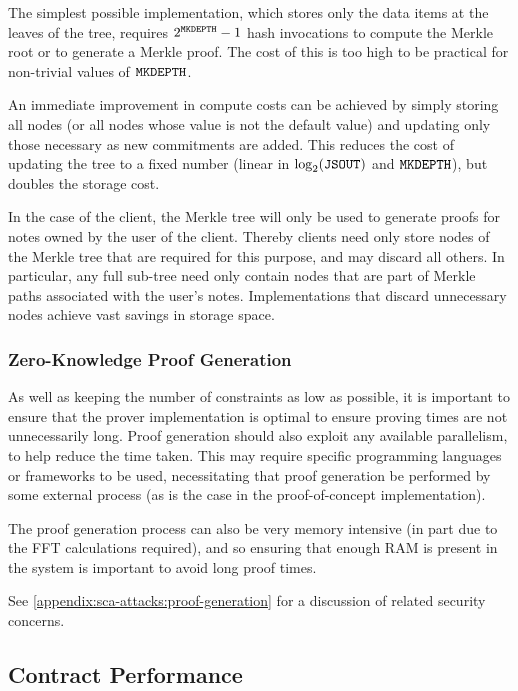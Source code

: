 The simplest possible implementation, which stores only the data items at the leaves of the tree, requires $2^{\mathtt{MKDEPTH}} - 1$ hash invocations to compute the Merkle root or to generate a Merkle proof. The cost of this is too high to be practical for non-trivial values of $\mathtt{MKDEPTH}$.

An immediate improvement in compute costs can be achieved by simply storing all nodes (or all nodes whose value is not the default value) and updating only those necessary as new commitments are added. This reduces the cost of updating the tree to a fixed number (linear in $\log_2(\mathtt{JSOUT})$ and $\mathtt{MKDEPTH}$), but doubles the storage cost.

In the case of the client, the Merkle tree will only be used to generate proofs for notes owned by the user of the client. Thereby clients need only store nodes of the Merkle tree that are required for this purpose, and may discard all others. In particular, any full sub-tree need only contain nodes that are part of Merkle paths associated with the user's notes. Implementations that discard unnecessary nodes achieve vast savings in storage space.

\subsubsection{Zero-Knowledge Proof Generation}

As well as keeping the number of constraints as low as possible, it is important to ensure that the prover implementation is optimal to ensure proving times are not unnecessarily long. Proof generation should also exploit any available parallelism, to help reduce the time taken. This may require specific programming languages or frameworks to be used, necessitating that proof generation be performed by some external process (as is the case in the proof-of-concept implementation).

The proof generation process can also be very memory intensive (in part due to the FFT calculations required), and so ensuring that enough RAM is present in the system is important to avoid long proof times.

See \cref{appendix:sca-attacks:proof-generation} for a discussion of related security concerns.

\subsection{Contract Performance}\label{implementation:efficiency:contract-performance}

